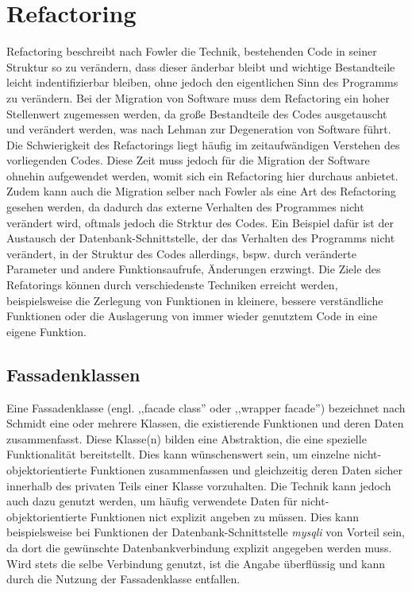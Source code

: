 \section{Refactoring}\label{refactoring} %
    Refactoring beschreibt nach Fowler die Technik, bestehenden Code in seiner Struktur so zu verändern, dass dieser änderbar bleibt und wichtige Bestandteile leicht indentifizierbar 
    bleiben, ohne jedoch den eigentlichen Sinn des Programms zu verändern. \cite{fowler_refactoring_1999} Bei der Migration von Software muss dem Refactoring ein hoher Stellenwert zugemessen werden, 
    da große Bestandteile des Codes ausgetauscht und verändert werden, was nach Lehman \cite[S. 1060-1076]{lehman_programs_1980} zur Degeneration von Software führt.
    Die Schwierigkeit des Refactorings liegt häufig im zeitaufwändigen Verstehen des vorliegenden Codes. Diese Zeit muss jedoch für die Migration der Software ohnehin 
    aufgewendet werden, womit sich ein Refactoring hier durchaus anbietet. Zudem kann auch die Migration selber nach Fowler als eine 
    Art des Refactoring gesehen werden, da dadurch das externe Verhalten des Programmes nicht verändert wird, oftmals jedoch 
    die Strktur des Codes. Ein Beispiel dafür ist der Austausch der Datenbank-Schnittstelle, der das Verhalten des Programms 
    nicht verändert, in der Struktur des Codes allerdings, bspw. durch veränderte Parameter und andere Funktionsaufrufe, 
    Änderungen erzwingt.
    Die Ziele des Refatorings können durch verschiedenste Techniken erreicht werden, beispielsweise die Zerlegung von Funktionen in kleinere, bessere verständliche 
    Funktionen oder die Auslagerung von immer wieder genutztem Code in eine eigene Funktion.
    \subsection{Fassadenklassen}\label{facade}
    Eine Fassadenklasse (engl. ,,facade class'' oder ,,wrapper facade'') bezeichnet nach Schmidt eine oder mehrere Klassen, die 
    existierende Funktionen und deren Daten zusammenfasst. Diese Klasse(n) bilden eine Abstraktion, die eine spezielle 
    Funktionalität bereitstellt. \cite[S. 54]{schmidt_pattern-oriented_2000} 
    Dies kann wünschenswert sein, um einzelne nicht-objektorientierte Funktionen zusammenfassen und gleichzeitig deren Daten 
    sicher innerhalb des privaten Teils einer Klasse vorzuhalten. Die Technik kann jedoch auch dazu genutzt werden, um häufig 
    verwendete Daten für nicht-objektorientierte Funktionen nict explizit angeben zu müssen. Dies kann beispielsweise 
    bei Funktionen der Datenbank-Schnittstelle \textit{mysqli} von Vorteil sein, da dort die gewünschte Datenbankverbindung 
    explizit angegeben werden muss. Wird stets die selbe Verbindung genutzt, ist die Angabe überflüssig und kann durch die 
    Nutzung der Fassadenklasse entfallen. 
